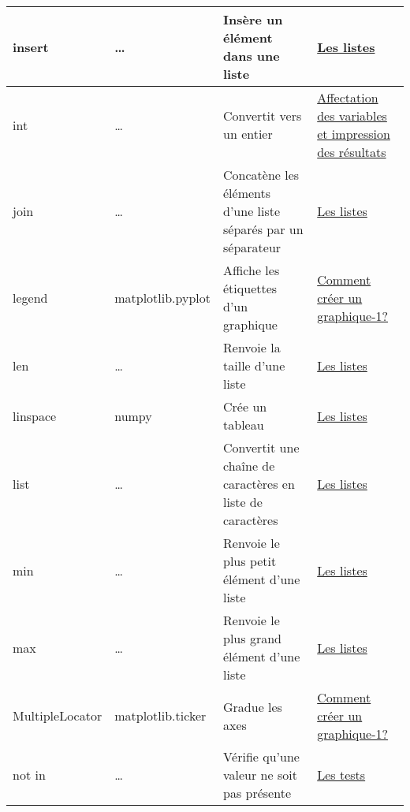 \begin{longtable}{@{\extracolsep{\fill}}|p{} | p{} |p{} | p{}|@{}}
insert
 & 
\ldots{}
 & 
Insère un élément dans une liste
 & 
\href{https://pyspc.readthedocs.io/fr/latest/05-bases/08-listes.html}{Les
listes}
\\ \hline

int
 & 
\ldots{}
 & 
Convertit vers un entier
 & 
\href{https://pyspc.readthedocs.io/fr/latest/05-bases/02-variables_input_print.html}{Affectation
des variables et impression des résultats}
\\ \hline

join
 & 
\ldots{}
 & 
Concatène les éléments d'une liste séparés par un séparateur
 & 
\href{https://pyspc.readthedocs.io/fr/latest/05-bases/08-listes.html}{Les
listes}
\\ \hline

legend
 & 
matplotlib.pyplot
 & 
Affiche les étiquettes d'un graphique
 & 
\href{https://pyspc.readthedocs.io/fr/latest/05-bases/10-graphiques_partie_1.html}{Comment
créer un graphique-1?}
\\ \hline

len
 & 
\ldots{}
 & 
Renvoie la taille d'une liste
 & 
\href{https://pyspc.readthedocs.io/fr/latest/05-bases/08-listes.html}{Les
listes}
\\ \hline

linspace
 & 
numpy
 & 
Crée un tableau
 & 
\href{https://pyspc.readthedocs.io/fr/latest/05-bases/08-listes.html}{Les
listes}
\\ \hline

list
 & 
\ldots{}
 & 
Convertit une chaîne de caractères en liste de caractères
 & 
\href{https://pyspc.readthedocs.io/fr/latest/05-bases/08-listes.html}{Les
listes}
\\ \hline

min
 & 
\ldots{}
 & 
Renvoie le plus petit élément d'une liste
 & 
\href{https://pyspc.readthedocs.io/fr/latest/05-bases/08-listes.html}{Les
listes}
\\ \hline

max
 & 
\ldots{}
 & 
Renvoie le plus grand élément d'une liste
 & 
\href{https://pyspc.readthedocs.io/fr/latest/05-bases/08-listes.html}{Les
listes}
\\ \hline

MultipleLocator
 & 
matplotlib.ticker
 & 
Gradue les axes
 & 
\href{https://pyspc.readthedocs.io/fr/latest/05-bases/10-graphiques_partie_1.html}{Comment
créer un graphique-1?}
\\ \hline

not in
 & 
\ldots{}
 & 
Vérifie qu'une valeur ne soit pas présente
 & 
\href{https://pyspc.readthedocs.io/fr/latest/05-bases/05-tests.html}{Les
tests}
\\ \hline


\end{longtable}
